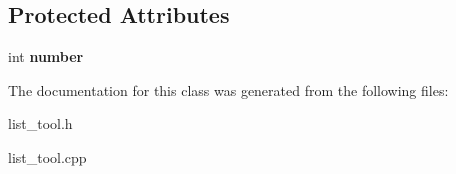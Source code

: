 \subsection*{Protected Attributes}
\begin{DoxyCompactItemize}
\item 
\hypertarget{class_num__element_a2a4b3a4fc6592ddc625786804e4800f2}{int {\bfseries number}}\label{d8/d1c/class_num__element_a2a4b3a4fc6592ddc625786804e4800f2}

\end{DoxyCompactItemize}


The documentation for this class was generated from the following files\-:\begin{DoxyCompactItemize}
\item 
list\-\_\-tool.\-h\item 
list\-\_\-tool.\-cpp\end{DoxyCompactItemize}
